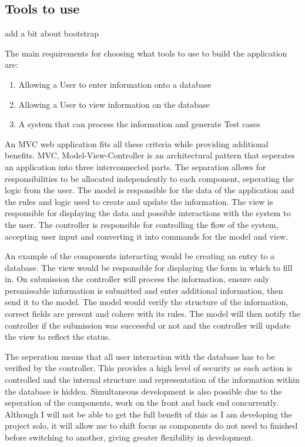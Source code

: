 \documentclass{article}
\begin{document}
\subsection{Tools to use}
\par add a bit about bootstrap
\par The main requirements for choosing what tools to use to build the application are:
\begin{enumerate}
\item Allowing a User to enter information onto a database
\item Allowing a User to view information on the database
\item A system that can process the information and generate Test cases
\end{enumerate}
\par An MVC web application fits all these criteria while providing additional benefits. MVC, Model-View-Controller is an architectural pattern that seperates an application into three interconnected parts. The separation allows for responsibilities to be allocated independently to each component, seperating the logic from the user. The model is responsible for the data of the application and the rules and logic used to create and update the information. The view is responsible for displaying the data and possible interactions with the system to the user. The controller is responsible for controlling the flow of the system,  accepting user input and converting it into commands for the model and view.
\par An example of the components interacting would be creating an entry to a database. The view would be responsible for displaying the form in which to fill in. On submission the controller will process the information, ensure only persmissable information is submitted and enter additional information, then send it to the model. The model would verify the structure of the information, correct fields are present and cohere with its rules. The model will then notify the controller if the submission was successful or not and the controller will update the view to reflect the status.
\par The seperation means that all user interaction with the database has to be verified by the controller. This provides a high level of security as each action is controlled and the internal structure and representation of the information within the database is hidden. Simultaneous development is also possible due to the seperation of the components, work on the front and back end concurrently. Although I will not be able to get the full benefit of this as I am developing the project solo, it will allow me to shift focus as components do not need to finished before switching to another, giving greater flexibility in development. 
\end{document}
